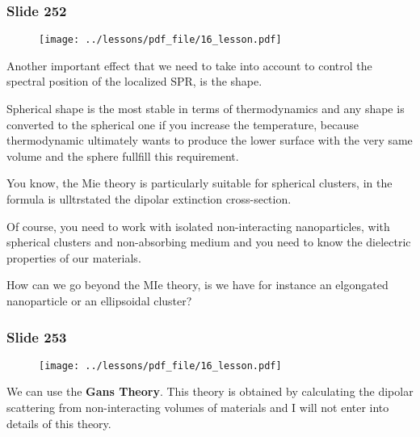 \documentclass[../main/main.tex]{subfiles}
\begin{document}
\newpage

\subsubsection{Slide 252}

\begin{figure}[h!]
\centering
\texttt{[image: ../lessons/pdf\_file/16\_lesson.pdf]}
\end{figure}

Another important effect that we need to take into account to control the spectral position of the localized SPR, is the shape.

Spherical shape is the most stable in terms of thermodynamics and any shape is converted to the spherical one if you increase the temperature, because thermodynamic ultimately wants to produce the lower surface with the very same volume and the sphere fullfill this requirement.

You know, the Mie theory is particularly suitable for spherical clusters, in the formula is ulltrstated the dipolar extinction cross-section.

Of course, you need to work with isolated non-interacting nanoparticles, with spherical clusters and non-absorbing medium and you need to know the dielectric properties of our materials.

How can we go beyond the MIe theory, is we have for instance an elgongated nanoparticle or an ellipsoidal cluster?


\newpage

\subsubsection{Slide 253}

\begin{figure}[h!]
\centering
\texttt{[image: ../lessons/pdf\_file/16\_lesson.pdf]}
\end{figure}

We can use the \textbf{Gans Theory}. This theory is obtained by calculating the dipolar scattering from non-interacting volumes of materials and I will not enter into details of this theory.
\end{document}

